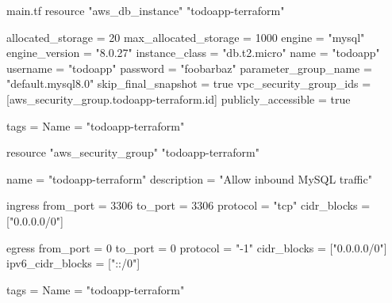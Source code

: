 \documentclass{csse4400}
\begin{document}
\begin{code}[language=terraform]{main.tf}
resource "aws_db_instance" "todoapp-terraform" {
  allocated_storage      = 20
  max_allocated_storage  = 1000
  engine                 = "mysql"
  engine_version         = "8.0.27"
  instance_class         = "db.t2.micro"
  name                   = "todoapp"
  username               = "todoapp"
  password               = "foobarbaz"
  parameter_group_name   = "default.mysql8.0"
  skip_final_snapshot    = true
  vpc_security_group_ids = [aws_security_group.todoapp-terraform.id]
  publicly_accessible    = true

  tags = {
    Name = "todoapp-terraform"
  }
}

resource "aws_security_group" "todoapp-terraform" {
  name        = "todoapp-terraform"
  description = "Allow inbound MySQL traffic"

  ingress {
    from_port        = 3306
    to_port          = 3306
    protocol         = "tcp"
    cidr_blocks      = ["0.0.0.0/0"]
  }

  egress {
    from_port        = 0
    to_port          = 0
    protocol         = "-1"
    cidr_blocks      = ["0.0.0.0/0"]
    ipv6_cidr_blocks = ["::/0"]
  }

  tags = {
    Name = "todoapp-terraform"
  }
}
\end{code}




\end{document}
